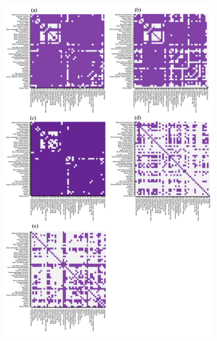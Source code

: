 \documentclass[10pt,letterpaper]{article}
\begin{document}
\begin{figure}[ht]
\centering
\includegraphics[height=9in, width=6in]{../figs-edits/figS3-edits.pdf}
\end{figure}
\end{document}
